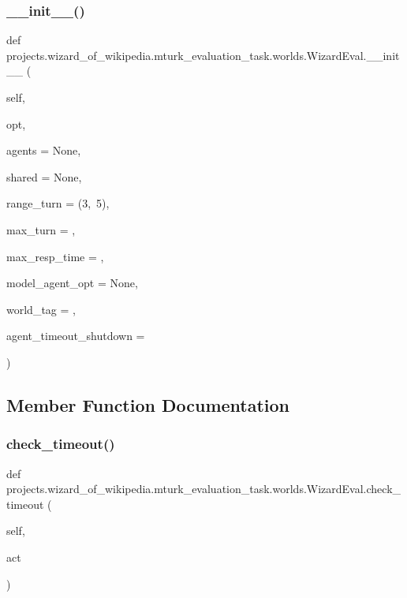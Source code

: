 \subsubsection{\texorpdfstring{\+\_\+\+\_\+init\+\_\+\+\_\+()}{\_\_init\_\_()}}
{\footnotesize\ttfamily def projects.\+wizard\+\_\+of\+\_\+wikipedia.\+mturk\+\_\+evaluation\+\_\+task.\+worlds.\+Wizard\+Eval.\+\_\+\+\_\+init\+\_\+\+\_\+ (\begin{DoxyParamCaption}\item[{}]{self,  }\item[{}]{opt,  }\item[{}]{agents = {\ttfamily None},  }\item[{}]{shared = {\ttfamily None},  }\item[{}]{range\+\_\+turn = {\ttfamily (3,~5)},  }\item[{}]{max\+\_\+turn = {},  }\item[{}]{max\+\_\+resp\+\_\+time = {},  }\item[{}]{model\+\_\+agent\+\_\+opt = {\ttfamily None},  }\item[{}]{world\+\_\+tag = {\ttfamily \textquotesingle{}\textquotesingle{}},  }\item[{}]{agent\+\_\+timeout\+\_\+shutdown = {} }\end{DoxyParamCaption})}



\subsection{Member Function Documentation}
\mbox{\label{classprojects_1_1wizard__of__wikipedia_1_1mturk__evaluation__task_1_1worlds_1_1WizardEval_a49e222b755af51462cba1320eadc4f53}} 
\subsubsection{\texorpdfstring{check\+\_\+timeout()}{check\_timeout()}}
{\footnotesize\ttfamily def projects.\+wizard\+\_\+of\+\_\+wikipedia.\+mturk\+\_\+evaluation\+\_\+task.\+worlds.\+Wizard\+Eval.\+check\+\_\+timeout (\begin{DoxyParamCaption}\item[{}]{self,  }\item[{}]{act }\end{DoxyParamCaption})}

